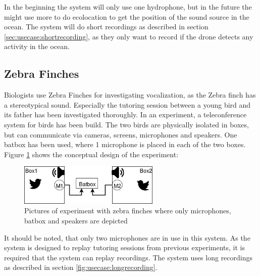 In the beginning the system will only use one hydrophone, but in the future the might use more to do ecolocation to get the position of the sound source in the ocean.
The system will do short recordings as described in section \ref{sec:usecase:shortrecording}, as they only want to record if the drone detects any activity in the ocean.

\subsection{Zebra Finches}
Biologists use Zebra Finches for investigating vocalization, as the Zebra finch has a stereotypical sound. Especially the tutoring session between a young bird and its father has been investigated thoroughly. In an experiment, a teleconference system for birds has been build. The two birds are physically isolated in boxes,
but can communicate via cameras, screens, microphones and speakers. One batbox has been used, where 1 microphone is placed in each of the two boxes.\citep{larsen2016system}
Figure \ref{fig:usecases:zebra:overview} shows the conceptual design of the experiment:

\begin{figure}[h!]
	\centering
	\includegraphics[width=0.6\textwidth]{figures/zebrafinches_experiment1.png}
	\caption{Pictures of experiment with zebra finches where only microphones, batbox and speakers are depicted}\label{fig:usecases:zebra:overview}
\end{figure}
It should be noted, that only two microphones are in use in this system.
As the system is designed to replay tutoring sessions from previous experiments, it is required that the system can replay recordings.
The system uses long recordings as described in section \ref{fig:usecase:longrecording}.


